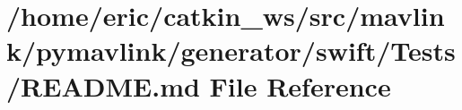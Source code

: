 \hypertarget{mavlink_2pymavlink_2generator_2swift_2Tests_2README_8md}{}\section{/home/eric/catkin\+\_\+ws/src/mavlink/pymavlink/generator/swift/\+Tests/\+R\+E\+A\+D\+ME.md File Reference}
\label{mavlink_2pymavlink_2generator_2swift_2Tests_2README_8md}
